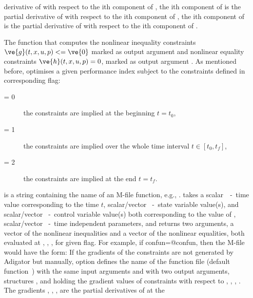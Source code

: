 \begin{description}
   derivative of  with respect to the ith component of
   , the ith component of  is the partial
   derivative of  with respect to the ith component of
   , the ith component of  is the partial
   derivative of  with respect to the ith component of
   .  
\item[\argfun{confun}] The function that computes the nonlinear
  inequality constraints $\ve{g}(t,x,u,p)<=\ve{0}$ marked as output
  argument  and nonlinear equality constraints
  $\ve{h}(t,x,u,p)=0$, marked as output argument . As
  mentioned before,  optimises a given performance index
  subject to the constraints defined in corresponding flag:
  \begin{description}
  \item[ = 0] the constraints are implied at the
    beginning $t = t_{0}$,
  \item[ = 1] the constraints are implied over the whole
    time interval $t \in [t_{0},t_{f}]$,
  \item[ = 2] the constraints are implied at the end $t
  = t_{f}$.
  \end{description}
   is a string containing the name of an M-file
  function, e.g., .  takes a
  scalar~~-~time value corresponding to the time $t$,
  scalar/vec\-tor ~-~state variable value(s), and
  scalar/vector ~-~control variable value(s) both
  corresponding to the value of , scalar/vector
  ~-~time independent parameters, and returns two arguments,
  a vector  of the nonlinear inequalities and a vector
   of the nonlinear equalities, both evaluated at
  , , ,  for given flag. For
  example, if confun=@confun, then the M-file  would
  have the form: 
  {\small }
  If the gradients of the constraints are not generated by Adigator
  but manually, option  defines the name of the
  function file (default function~) with the same input
  arguments and with two output arguments,
  structures , and  holding the gradient
  values of constraints with respect to , ,
  , .
  {\small }
  The gradients , , ,
   are the partial derivatives of  at the

\end{description}

